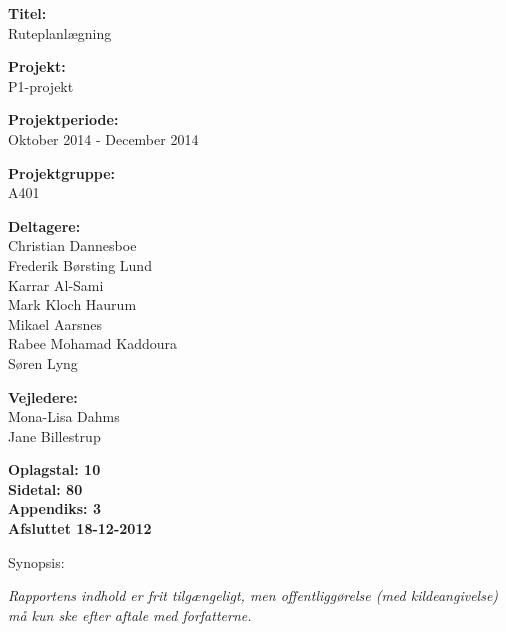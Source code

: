 \begin{minipage}[t]{0.48\textwidth}
\textbf{Titel:} \\[5pt]\bigskip\hspace{2ex}
Ruteplanlægning

\textbf{Projekt:} \\[5pt]\bigskip\hspace{2ex}
P1-projekt

\textbf{Projektperiode:} \\[5pt]\bigskip\hspace{2ex}
Oktober 2014 - December 2014

\textbf{Projektgruppe:} \\[5pt]\bigskip\hspace{2ex}
A401	

\textbf{Deltagere:} \\[5pt]\hspace*{2ex}
Christian Dannesboe \\\hspace*{2ex}
Frederik Børsting Lund \\\hspace*{2ex}
Karrar Al-Sami \\\hspace*{2ex}
Mark Kloch Haurum \\\hspace*{2ex}
Mikael Aarsnes \\\hspace*{2ex}
Rabee Mohamad Kaddoura \\\bigskip\hspace{2ex}
Søren Lyng

\textbf{Vejledere:} \\[5pt]\hspace*{2ex}
Mona-Lisa Dahms \\\bigskip\hspace{2ex}
Jane Billestrup

\vspace*{1cm}

\textbf{Oplagstal: 10} \\
\textbf{Sidetal: 80} \\
\textbf{Appendiks: 3} \\ 
\textbf{Afsluttet 18-12-2012}

\end{minipage}
\hfill
\begin{minipage}[t]{0.483\textwidth}
Synopsis: \\[5pt]
\fbox{\parbox{7cm}{\bigskip\bigskip}}
\end{minipage}

\vfill

{\footnotesize\itshape Rapportens indhold er frit tilgængeligt, men offentliggørelse (med kildeangivelse) må kun ske efter aftale med forfatterne.}

